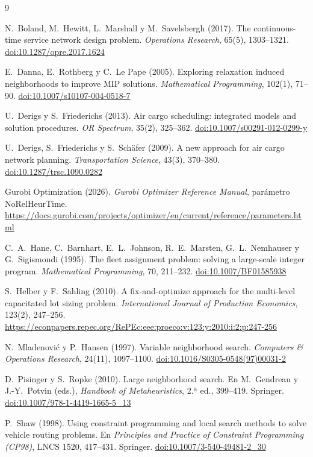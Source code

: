\documentclass[11pt,a4paper]{article}
\begin{document}
\begin{thebibliography}{9}
\small

 N.~Boland, M.~Hewitt, L.~Marshall y M.~Savelsbergh (2017). The continuous-time service network design problem. \emph{Operations Research}, 65(5), 1303--1321. \href{https://doi.org/10.1287/opre.2017.1624}{doi:10.1287/opre.2017.1624}

 E.~Danna, E.~Rothberg y C.~Le Pape (2005). Exploring relaxation induced neighborhoods to improve MIP solutions. \emph{Mathematical Programming}, 102(1), 71--90. \href{https://doi.org/10.1007/s10107-004-0518-7}{doi:10.1007/s10107-004-0518-7}

 U.~Derigs y S.~Friederichs (2013). Air cargo scheduling: integrated models and solution procedures. \emph{OR Spectrum}, 35(2), 325--362. \href{https://doi.org/10.1007/s00291-012-0299-y}{doi:10.1007/s00291-012-0299-y}

 U.~Derigs, S.~Friederichs y S.~Schäfer (2009). A new approach for air cargo network planning. \emph{Transportation Science}, 43(3), 370--380. \href{https://doi.org/10.1287/trsc.1090.0282}{doi:10.1287/trsc.1090.0282}

 Gurobi Optimization (2026). \emph{Gurobi Optimizer Reference Manual}, parámetro NoRelHeurTime. \url{https://docs.gurobi.com/projects/optimizer/en/current/reference/parameters.html}

 C.~A.~Hane, C.~Barnhart, E.~L.~Johnson, R.~E.~Marsten, G.~L.~Nemhauser y G.~Sigismondi (1995). The fleet assignment problem: solving a large-scale integer program. \emph{Mathematical Programming}, 70, 211--232. \href{https://doi.org/10.1007/BF01585938}{doi:10.1007/BF01585938}

 S.~Helber y F.~Sahling (2010). A fix-and-optimize approach for the multi-level capacitated lot sizing problem. \emph{International Journal of Production Economics}, 123(2), 247--256. \url{https://econpapers.repec.org/RePEc:eee:proeco:v:123:y:2010:i:2:p:247-256}

 N.~Mladenović y P.~Hansen (1997). Variable neighborhood search. \emph{Computers \& Operations Research}, 24(11), 1097--1100. \href{https://doi.org/10.1016/S0305-0548(97)00031-2}{doi:10.1016/S0305-0548(97)00031-2}

 D.~Pisinger y S.~Ropke (2010). Large neighborhood search. En M.~Gendreau y J.-Y.~Potvin (eds.), \emph{Handbook of Metaheuristics}, 2.ª ed., 399--419. Springer. \href{https://doi.org/10.1007/978-1-4419-1665-5_13}{doi:10.1007/978-1-4419-1665-5\_13}

 P.~Shaw (1998). Using constraint programming and local search methods to solve vehicle routing problems. En \emph{Principles and Practice of Constraint Programming (CP98)}, LNCS 1520, 417--431. Springer. \href{https://doi.org/10.1007/3-540-49481-2_30}{doi:10.1007/3-540-49481-2\_30}

\end{thebibliography}
\end{document}
